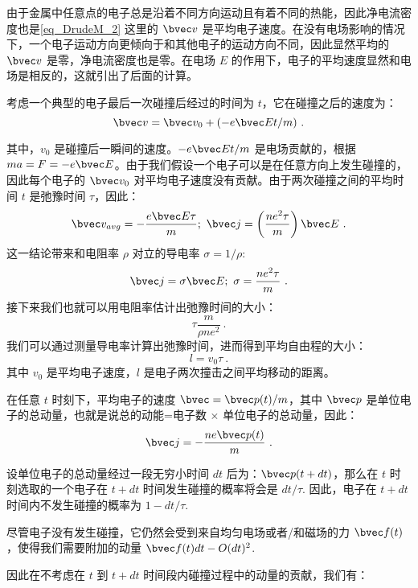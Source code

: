 由于金属中任意点的电子总是沿着不同方向运动且有着不同的热能，因此净电流密度也是\autoref{eq_DrudeM_2} 这里的 $\bvec v$ 是平均电子速度。在没有电场影响的情况下，一个电子运动方向更倾向于和其他电子的运动方向不同，因此显然平均的 $\bvec v$ 是零，净电流密度也是零。在电场 $E$ 的作用下，电子的平均速度显然和电场是相反的，这就引出了后面的计算。

考虑一个典型的电子最后一次碰撞后经过的时间为 $t$，它在碰撞之后的速度为：
\begin{equation}
\bvec v = \bvec v_0 + (-e\bvec E t/m)~.
\end{equation}

其中，$v_0$ 是碰撞后一瞬间的速度。$-e\bvec E t/m$ 是电场贡献的，根据 $ma = F = -e\bvec E$。由于我们假设一个电子可以是在任意方向上发生碰撞的，因此每个电子的 $\bvec v_0$ 对平均电子速度没有贡献。由于两次碰撞之间的平均时间 $t$ 是弛豫时间 $\tau$，因此：
\begin{equation}
\bvec v_{avg} = -\frac{e\bvec E \tau}{m}; \ \bvec j =\left(\frac{ne^2\tau}{m}\right)\bvec E~.
\end{equation}
这一结论带来和电阻率 $\rho$ 对立的导电率 $\sigma = 1/\rho$:
\begin{equation}\label{eq_DrudeM_4}
\bvec j = \sigma \bvec E; \ \sigma = \frac{ne^2\tau}{m}~.
\end{equation}
接下来我们也就可以用电阻率估计出弛豫时间的大小：
\begin{equation}
\tau \frac{m}{\rho n e^2}~.
\end{equation}
我们可以通过测量导电率计算出弛豫时间，进而得到平均自由程的大小：
\begin{equation}
l=v_0\tau~.
\end{equation}
其中 $v_0$ 是平均电子速度，$l$ 是电子两次撞击之间平均移动的距离。

在任意 $t$ 时刻下，平均电子的速度 $\bvec=\bvec p(t)/m$，其中 $\bvec p$ 是单位电子的总动量，也就是说总的动能=电子数 $\times$ 单位电子的总动量，因此：
\begin{equation}
\bvec j= -\frac{ne\bvec p(t)}{m}~.
\end{equation}

设单位电子的总动量经过一段无穷小时间 $dt$ 后为：$\bvec p (t+dt)$，那么在 $t$ 时刻选取的一个电子在 $t+dt$ 时间发生碰撞的概率将会是 $dt/\tau$. 因此，电子在 $t+dt$ 时间内不发生碰撞的概率为 $1-dt/\tau$.

尽管电子没有发生碰撞，它仍然会受到来自均匀电场或者/和磁场的力 $\bvec f(t)$，使得我们需要附加的动量 $\bvec f(t)dt - O(dt)^2$.

因此在不考虑在 $t$ 到 $t+dt$ 时间段内碰撞过程中的动量的贡献，我们有：

